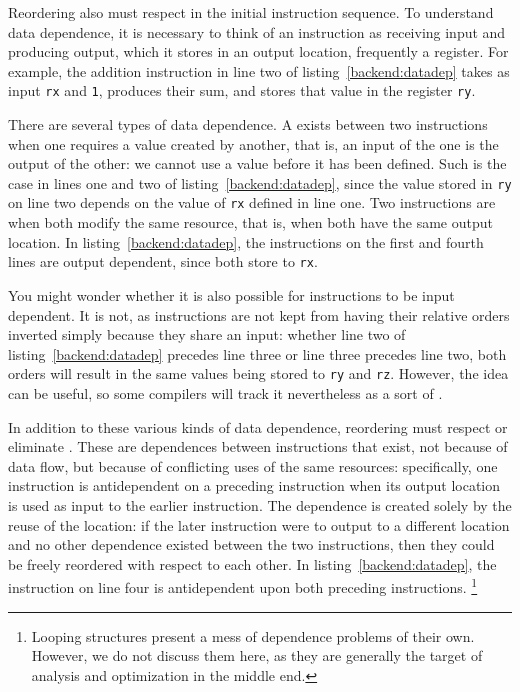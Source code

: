 Reordering also must respect  in the initial instruction sequence. To understand data dependence, it is necessary to think of an instruction as receiving input and producing output, which it stores in an output location, frequently a register. For example, the addition instruction in line two of listing~\ref{backend:datadep} %
takes as input \lstinline[style=riscpseudo]{rx} and \lstinline{1}, produces their sum, and stores that value in the register \lstinline[style=riscpseudo]{ry}.

There are several types of data dependence. A  exists between two instructions when one requires a value created by another, that is, an input of the one is the output of the other: we cannot use a value before it has been defined. Such is the case in lines one and two of listing~\ref{backend:datadep}, since the value stored in \lstinline[style=riscpseudo]{ry} on line two depends on the value of \lstinline[style=riscpseudo]{rx} defined in line one. Two instructions are  when both modify the same resource, that is, when both have the same output location. In listing~\ref{backend:datadep}, the instructions on the first and fourth lines are output dependent, since both store to \lstinline[style=riscpseudo]{rx}.

You might wonder whether it is also possible for instructions to be input dependent. It is not, as instructions are not kept from having their relative orders inverted simply because they share an input: whether line two of listing~\ref{backend:datadep} precedes line three or line three precedes line two, both orders will result in the same values being stored to \lstinline[style=riscpseudo]{ry} and \lstinline[style=riscpseudo]{rz}. However, the idea can be useful, so some compilers will track it nevertheless as a sort of .

In addition to these various kinds of data dependence, reordering must respect or eliminate . These are dependences between instructions that exist, not because of data flow, but because of conflicting uses of the same resources: specifically, one instruction is antidependent on a preceding instruction when its output location is used as input to the earlier instruction. The dependence is created solely by the reuse of the location: if the later instruction were to output to a different location and no other dependence existed between the two instructions, then they could be freely reordered with respect to each other. In listing~\ref{backend:datadep}, the instruction on line four is antidependent upon both preceding instructions.%
\footnote{Looping structures present a mess of dependence problems of their own. However, we do not discuss them here, as they are generally the target of analysis and optimization in the middle end.}


